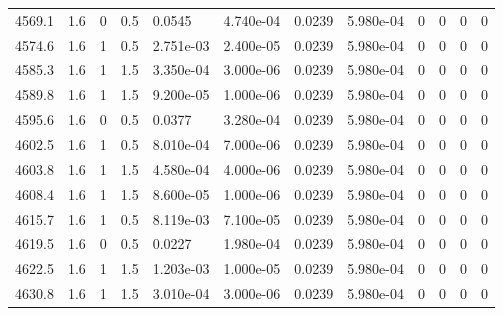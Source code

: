 \documentclass[preview]{standalone}
\begin{document}
{{{{{{{{{{{{{{{{{{\begin{tabular}{L{1.2cm}C{1.2cm} C{0.3cm}C{0.5cm} C{1.4cm}C{1.4cm} C{1.4cm}C{1.4cm} C{1.6cm}C{1.6cm} C{1.6cm}C{1.6cm}}
  4569.1  &   1.6  & 0     & 0.5 &  0.0545  & 4.740e-04  &  0.0239&   5.980e-04& 0 & 0   &  0 & 0  \\ 
  4574.6  &   1.6  & 1     & 0.5 &  2.751e-03  & 2.400e-05  &  0.0239&   5.980e-04& 0 & 0   &  0 & 0  \\ 
  4585.3  &   1.6  & 1     & 1.5 &  3.350e-04  & 3.000e-06  &  0.0239&   5.980e-04& 0 & 0   &  0 & 0  \\ 
  4589.8  &   1.6  & 1     & 1.5 &  9.200e-05  & 1.000e-06  &  0.0239&   5.980e-04& 0 & 0   &  0 & 0  \\ 
  4595.6  &   1.6  & 0     & 0.5 &  0.0377  & 3.280e-04  &  0.0239&   5.980e-04& 0 & 0   &  0 & 0  \\ 
  4602.5  &   1.6  & 1     & 0.5 &  8.010e-04  & 7.000e-06  &  0.0239&   5.980e-04& 0 & 0   &  0 & 0  \\ 
  4603.8  &   1.6  & 1     & 1.5 &  4.580e-04  & 4.000e-06  &  0.0239&   5.980e-04& 0 & 0   &  0 & 0  \\ 
  4608.4  &   1.6  & 1     & 1.5 &  8.600e-05  & 1.000e-06  &  0.0239&   5.980e-04& 0 & 0   &  0 & 0  \\ 
  4615.7  &   1.6  & 1     & 0.5 &  8.119e-03  & 7.100e-05  &  0.0239&   5.980e-04& 0 & 0   &  0 & 0  \\ 
  4619.5  &   1.6  & 0     & 0.5 &  0.0227  & 1.980e-04  &  0.0239&   5.980e-04& 0 & 0   &  0 & 0  \\ 
  4622.5  &   1.6  & 1     & 1.5 &  1.203e-03  & 1.000e-05  &  0.0239&   5.980e-04& 0 & 0   &  0 & 0  \\ 
  4630.8  &   1.6  & 1     & 1.5 &  3.010e-04  & 3.000e-06  &  0.0239&   5.980e-04& 0 & 0   &  0 & 0  \\ 
\hline 
\end{tabular} 

}}}}}}}}}}}}}}}}}}
\end{document}
